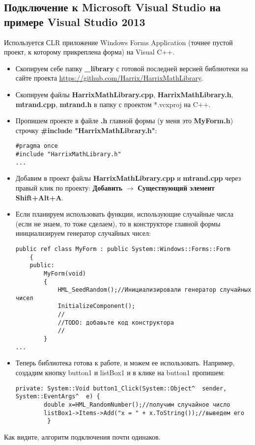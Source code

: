 \subsection{Подключение к Microsoft Visual Studio на примере Visual Studio 2013}

Используется СLR приложение Windows Forms Application (точнее пустой проект, к которому прикреплена форма) на Visual C++.

\begin{itemize}
\item Скопируем себе папку \textbf{\_library} с готовой последней версией библиотеки на сайте проекта \href{https://github.com/Harrix/HarrixMathLibrary}{https://github.com/Harrix/HarrixMathLibrary}.

\item Скопируем файлы \textbf{HarrixMathLibrary.cpp}, \textbf{HarrixMathLibrary.h}, \textbf{mtrand.cpp}, \textbf{mtrand.h} в папку с проектом *.vcxproj на C++.

\item Пропишем проекте в файле \textbf{.h} главной формы (у меня это \textbf{MyForm.h}) строчку \textbf{\#include "HarrixMathLibrary.h"}:
\begin{lstlisting}[label=install_code_07,caption=Подключение библиотеки]
#pragma once
#include "HarrixMathLibrary.h"
...
\end{lstlisting}

\item Добавим в проект файлы \textbf{HarrixMathLibrary.cpp} и \textbf{mtrand.cpp} через правый клик по проекту: \textbf{Добавить} $\rightarrow$ \textbf{Существующий элемент Shift+Alt+A}.

\item Если планируем использовать функции, использующие случайные числа (если не знаем, то тоже сделаем), то в конструкторе главной формы инициализируем генератор случайных чисел:
\begin{lstlisting}[label=install_code_08,caption=Инициализация генератора случайных чисел]
	public ref class MyForm : public System::Windows::Forms::Form
	{
	public:
		MyForm(void)
		{
			HML_SeedRandom();//Инициализировали генератор случайных чисел
			InitializeComponent();
			//
			//TODO: добавьте код конструктора
			//
		}
...
\end{lstlisting}

\item Теперь библиотека готова к работе, и можем ее использовать. Например, создадим кнопку button1 и listBox1 и в клике на button1 пропишем:
\begin{lstlisting}[label=install_code_09,caption=Пример использования]
private: System::Void button1_Click(System::Object^  sender, System::EventArgs^  e) {
 		double x=HML_RandomNumber();//получим случайное число
 		listBox1->Items->Add("x = " + x.ToString());//выведем его
 		 }
\end{lstlisting}
\end{itemize}

Как видите, алгоритм подключения почти одинаков.